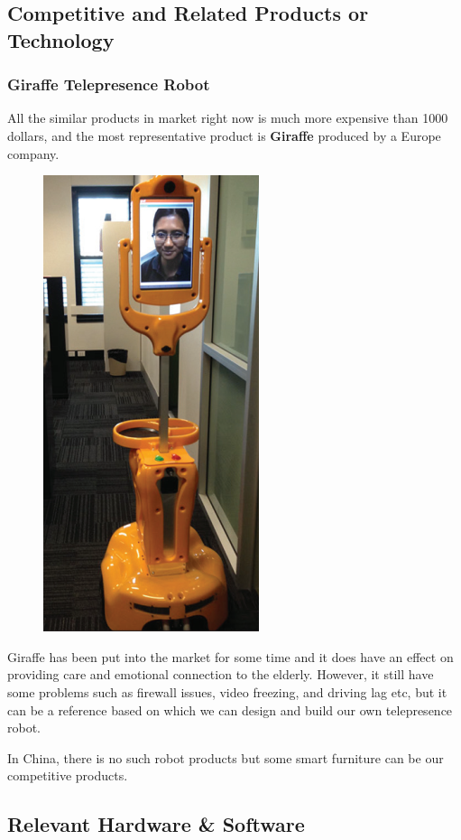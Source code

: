 \documentclass[12pt]{article}
\newcommand{\gadd}[1]{{\color{gray} #1}}
\begin{document}
\gadd{
\subsection{Competitive and Related Products or Technology}
\subsubsection{Giraffe Telepresence Robot}
All the similar products in market right now is much more expensive than 1000 dollars, and the most representative product is \textbf{Giraffe} produced by a Europe company.
\begin{figure}[H]
\centering
\includegraphics[scale=1]{P2.png}
\end{figure}
Giraffe has been put into the market for some time and it does have an effect on providing care and emotional connection to the elderly. However, it still have some problems such as firewall issues, video freezing, and driving lag etc, but it can be a reference based on which we can design and build our own telepresence robot.
\par In China, there is no such robot products but some smart furniture can be our competitive products.
\subsection{Relevant Hardware \& Software}
}
\end{document}
